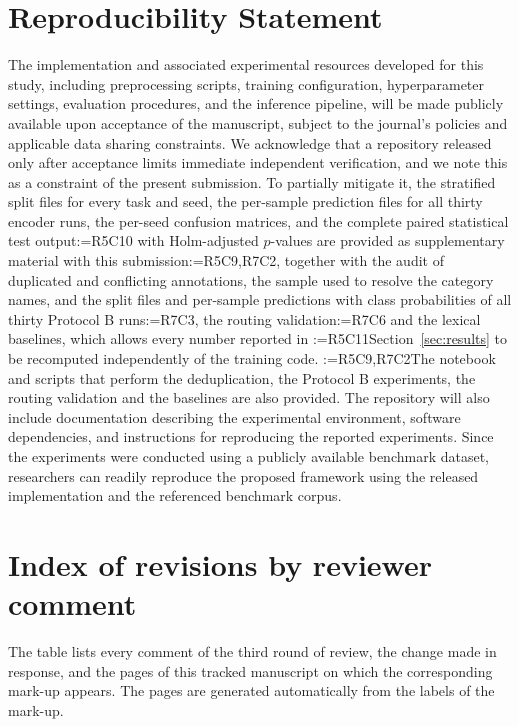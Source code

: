 \documentclass[a4paper,fleqn]{cas-sc}
\makeatletter
\newif\iftracked
\newcommand{\rv@setcolour}[1]{%
  \IfStrEq{#1}{R7C7}{\color{rvEdit}}{%
    \IfSubStr{#1}{R5}{\IfSubStr{#1}{R7}{\color{rvBoth}}{\color{rvFive}}}{\color{rvSeven}}}}
\newcommand{\rv@tag}[1]{\textsuperscript{\sffamily\bfseries\scriptsize[\StrSubstitute{#1}{,}{, }]}\,}
\newcommand{\rv@recordone}[1]{%
  \edef\rv@i{#1}%
  \ifcsdef{rv@n@\rv@i}{}{\csgdef{rv@n@\rv@i}{0}}%
  \csxdef{rv@n@\rv@i}{\the\numexpr\csuse{rv@n@\rv@i}+1\relax}%
  \begingroup\edef\@currentlabel{\rv@i}\label{rv:\rv@i:\csuse{rv@n@\rv@i}}\endgroup}
\newcommand{\rv@record}[1]{\@for\rv@id:=#1\do{\expandafter\rv@recordone\expandafter{\rv@id}}}
\DeclareRobustCommand{\rc}[2]{\rv@record{#1}\iftracked{\rv@setcolour{#1}\rv@tag{#1}#2}\else#2\fi}
\DeclareRobustCommand{\rcrep}[3]{\rv@record{#1}\iftracked{\rv@setcolour{#1}\rv@tag{#1}\rv@strike{#2} #3}\else#3\fi}
\makeatother
\begin{document}
\section{Reproducibility Statement}
\label{sec:repro}
The implementation and associated experimental resources developed for this study, including preprocessing scripts, training configuration, hyperparameter settings, evaluation procedures, and the inference pipeline, will be made publicly available upon acceptance of the manuscript, subject to the journal's policies and applicable data sharing constraints. We acknowledge that a repository released only after acceptance limits immediate independent verification, and we note this as a constraint of the present submission. To partially mitigate it, the stratified split files for every task and seed, the per-sample prediction files for all thirty encoder runs, the per-seed confusion matrices, and the complete paired statistical test output\rc{R5C10}{ with Holm-adjusted $p$-values} are provided as supplementary material with this submission\rc{R5C9,R7C2}{, together with the audit of duplicated and conflicting annotations, the sample used to resolve the category names, and the split files and per-sample predictions with class probabilities of all thirty Protocol B runs}\rc{R7C3}{, the routing validation}\rc{R7C6}{ and the lexical baselines}, which allows every number reported in \rcrep{R5C11}{Section 6}{Section~\ref{sec:results}} to be recomputed independently of the training code. \rc{R5C9,R7C2}{The notebook and scripts that perform the deduplication, the Protocol B experiments, the routing validation and the baselines are also provided.} The repository will also include documentation describing the experimental environment, software dependencies, and instructions for reproducing the reported experiments. Since the experiments were conducted using a publicly available benchmark dataset, researchers can readily reproduce the proposed framework using the released implementation and the referenced benchmark corpus.



\iftracked
\clearpage
\section*{Index of revisions by reviewer comment}
\small
The table lists every comment of the third round of review, the change made in response, and the pages of this tracked manuscript on which the corresponding mark-up appears. The pages are generated automatically from the labels of the mark-up.
\end{document}

